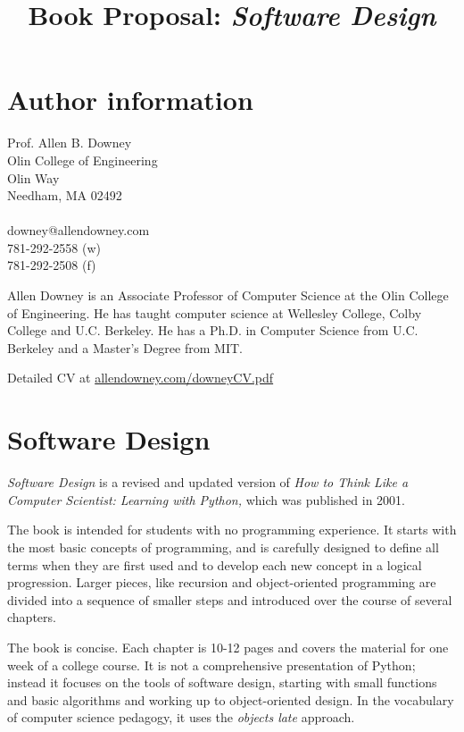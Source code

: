 \documentclass{article}
\title{Book Proposal: {\em Software Design}}
\author{}
\date{}
\begin{document}
\maketitle

\section*{Author information}

\begin{flushleft}
Prof. Allen B. Downey\\
Olin College of Engineering\\
Olin Way\\
Needham, MA 02492\\
\quad \\
downey@allendowney.com\\
781-292-2558 (w)\\
781-292-2508 (f)\\
\end{flushleft}

Allen Downey is an Associate Professor of Computer Science at the Olin
College of Engineering.  He has taught computer science at Wellesley
College, Colby College and U.C. Berkeley.  He has a Ph.D. in Computer
Science from U.C. Berkeley and a Master's Degree from MIT.

Detailed CV at \url{allendowney.com/downeyCV.pdf}


\section*{Software Design}

{\em Software Design} is a revised and
updated version of {\em How to Think Like a Computer Scientist: Learning
with Python,} which was published in 2001.

The book is intended for students with no programming experience.  It starts
with the most basic concepts of programming, and is carefully designed
to define all terms when they are first used and to develop each new
concept in a logical progression.  Larger pieces, like recursion and
object-oriented programming are divided into a sequence of smaller
steps and introduced over the course of several chapters.

The book is concise.  Each chapter is 10-12 pages and covers the
material for one week of a college course.  It is not a comprehensive
presentation of Python; instead it focuses on the tools of
software design, starting with small functions and basic algorithms and
working up to object-oriented design.  In the vocabulary of computer
science pedagogy, it uses the {\em objects late} approach.
\end{document}
